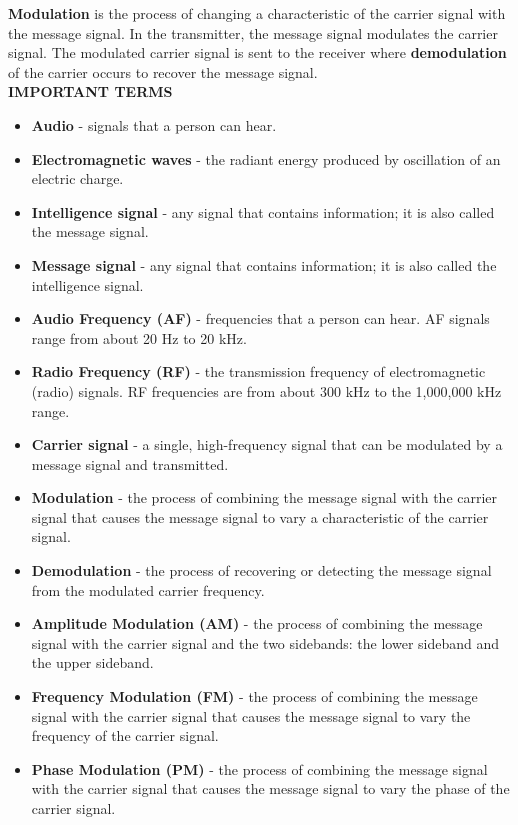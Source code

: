 \documentclass{book}
\begin{document}
\textbf{Modulation} is the process of changing a characteristic of the carrier signal with the message
signal. In the transmitter, the message signal modulates the carrier signal.
The modulated carrier signal is sent to the receiver where \textbf{demodulation} of the carrier occurs to
recover the message signal.\\[10pt]
\textsc{\textbf {IMPORTANT TERMS}}
\begin{itemize}
\item \textbf{Audio} - signals that a person can hear.

\item \textbf{Electromagnetic waves} - the radiant energy produced by oscillation of an electric
charge.

\item \textbf{Intelligence signal} - any signal that contains information; it is also called the
message signal.
\item \textbf{Message signal} - any signal that contains information; it is also called
the intelligence signal. 
\item \textbf{Audio Frequency (AF)} - frequencies that a person can hear.
AF signals range from about 20 Hz to 20 kHz.
\item \textbf{Radio Frequency (RF)} - the transmission frequency of electromagnetic (radio) signals.
RF frequencies are from about 300 kHz to the 1,000,000 kHz range.
\item \textbf{Carrier signal} - a single, high-frequency signal that can be modulated by a message
signal and transmitted.
\item \textbf{Modulation} - the process of combining the message signal with the carrier signal that
causes the message signal to vary a characteristic of the carrier signal.
\item \textbf{Demodulation} - the process of recovering or detecting the message signal from the
modulated carrier frequency.
\item \textbf{Amplitude Modulation (AM)} - the process of combining the message signal with
the carrier signal and the two sidebands: the lower sideband and the upper
sideband.
\item \textbf{Frequency Modulation (FM)} - the process of combining the message signal with
the carrier signal that causes the message signal to vary the frequency of the
carrier signal.
\item \textbf{Phase Modulation (PM)} - the process of combining the message signal with the
carrier signal that causes the message signal to vary the phase of the carrier signal.

\end{itemize}
\end{document}
